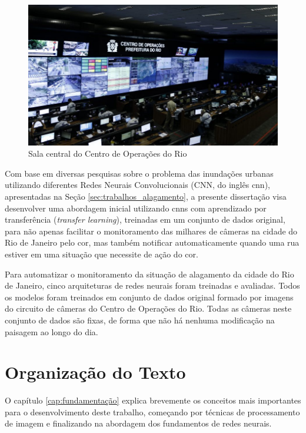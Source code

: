 \begin{figure}[htb]
\centerline{\includegraphics[width=0.9\linewidth]{images/46627458084_451cf87027_k.jpg}}
\caption{Sala central do Centro de Operações do Rio}
\label{fig:cor}
\end{figure}

Com base em diversas pesquisas sobre o problema das inundações urbanas utilizando diferentes Redes Neurais Convolucionais (CNN, do inglês \acrlong{cnn}),
apresentadas na Seção \ref{sec:trabalhos_alagamento}, 
a presente dissertação visa desenvolver uma abordagem inicial utilizando \acrshort{cnn}s com aprendizado por transferência (\textit{transfer learning}), treinadas em um conjunto de dados original, 
para não apenas facilitar o monitoramento das milhares de câmeras na cidade do Rio de Janeiro pelo \acrshort{cor}, 
mas também notificar automaticamente quando uma rua estiver em uma situação que necessite de ação do \acrshort{cor}.

Para automatizar o monitoramento da situação de alagamento da cidade do Rio de Janeiro, cinco arquiteturas de redes neurais foram treinadas e avaliadas. Todos os modelos foram treinados em conjunto de dados original formado por imagens do circuito de câmeras do Centro de Operações do Rio.
Todas as câmeras neste conjunto de dados são fixas, de forma que não há nenhuma modificação na paisagem ao longo do dia.

\section{Organização do Texto}\label{Organização do texto}

O capítulo \ref{cap:fundamentação} explica brevemente os conceitos mais importantes para o desenvolvimento deste trabalho, começando por técnicas de processamento de imagem e finalizando na abordagem dos fundamentos de redes neurais.

